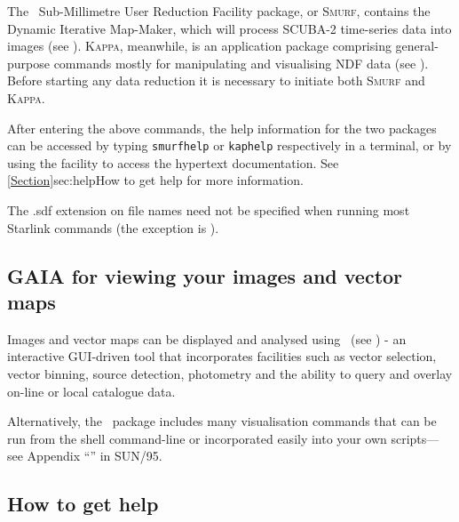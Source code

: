 The \starlink\ Sub-Millimetre User Reduction Facility package, or \textsc{Smurf},
contains the Dynamic Iterative Map-Maker, which will process
SCUBA-2 time-series data into images (see \smurfsun). \textsc{Kappa}, meanwhile, is
an application package comprising general-purpose commands mostly for
manipulating and visualising NDF data (see \kappasun). Before starting
any data reduction it is necessary to initiate both \textsc{Smurf} and
\textsc{Kappa}.

\begin{terminalv}
\end{terminalv}

After entering the above commands, the help information
for the two packages can be accessed by typing \texttt{smurfhelp} or
\texttt{kaphelp} respectively in a terminal, or by using the
 facility to access the hypertext documentation. See
\cref{Section}{sec:help}{How to get help} for more information.



\begin{tip}
The .sdf extension on file names need not be specified when running most
Starlink commands (the exception is \picard).
\end{tip}


\subsection{GAIA for viewing your images and vector maps}
Images and vector maps can be displayed and analysed using \gaia\ (see
\gaiasun) - an interactive GUI-driven tool that incorporates facilities
such as vector selection, vector binning, source detection, photometry
and the ability to query and overlay on-line or local catalogue data.
\begin{terminalv}
\end{terminalv}

Alternatively, the \Kappa\ package includes many visualisation commands
that can be run from the shell command-line or incorporated easily into your
own scripts---see Appendix ``''
in SUN/95.


\subsection{How to get help}
\label{sec:help}


